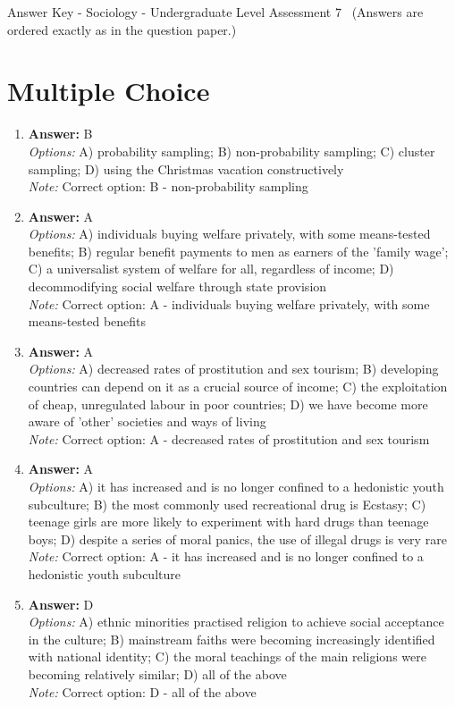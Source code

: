 \documentclass[12pt]{article}
\begin{document}
\begin{center}
Answer Key - Sociology - Undergraduate Level Assessment 7 \
\small (Answers are ordered exactly as in the question paper.)
\end{center}

\section*{Multiple Choice}
\begin{enumerate}[label=\arabic*.]
\item \textbf{Answer:} B
\\ \textit{Options:} A) probability sampling; B) non-probability sampling; C) cluster sampling; D) using the Christmas vacation constructively
\\ \textit{Note:} Correct option: B - non-probability sampling
\item \textbf{Answer:} A
\\ \textit{Options:} A) individuals buying welfare privately, with some means-tested benefits; B) regular benefit payments to men as earners of the 'family wage'; C) a universalist system of welfare for all, regardless of income; D) decommodifying social welfare through state provision
\\ \textit{Note:} Correct option: A - individuals buying welfare privately, with some means-tested benefits
\item \textbf{Answer:} A
\\ \textit{Options:} A) decreased rates of prostitution and sex tourism; B) developing countries can depend on it as a crucial source of income; C) the exploitation of cheap, unregulated labour in poor countries; D) we have become more aware of 'other' societies and ways of living
\\ \textit{Note:} Correct option: A - decreased rates of prostitution and sex tourism
\item \textbf{Answer:} A
\\ \textit{Options:} A) it has increased and is no longer confined to a hedonistic youth subculture; B) the most commonly used recreational drug is Ecstasy; C) teenage girls are more likely to experiment with hard drugs than teenage boys; D) despite a series of moral panics, the use of illegal drugs is very rare
\\ \textit{Note:} Correct option: A - it has increased and is no longer confined to a hedonistic youth subculture
\item \textbf{Answer:} D
\\ \textit{Options:} A) ethnic minorities practised religion to achieve social acceptance in the culture; B) mainstream faiths were becoming increasingly identified with national identity; C) the moral teachings of the main religions were becoming relatively similar; D) all of the above
\\ \textit{Note:} Correct option: D - all of the above
\end{enumerate}
\end{document}
